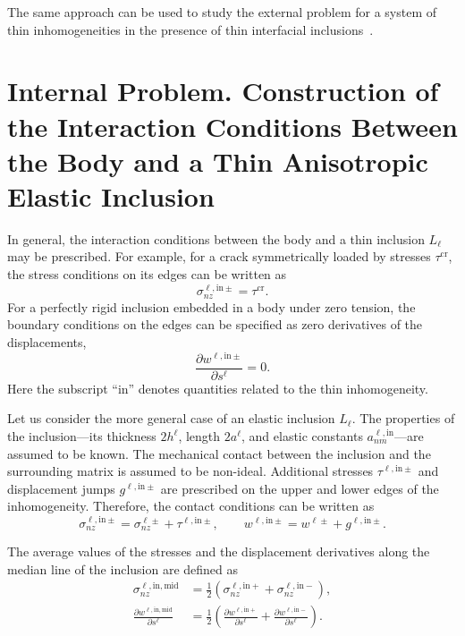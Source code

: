 The same approach can be used to study the external problem for a system of thin inhomogeneities in the presence of thin interfacial inclusions~\cite{Vasilev28}.

\section{Internal Problem. Construction of the Interaction Conditions Between the Body and a Thin Anisotropic Elastic Inclusion}\label{VasilevSec6}

In general, the interaction conditions between the body and a thin inclusion $L_{\ell}$ may be prescribed.
For example, for a crack symmetrically loaded by stresses $\tau^{\mathrm{cr}}$, the stress conditions on its edges can be written as
\[
\sigma_{nz}^{\ell,\mathrm{in}\pm}=\tau^{\mathrm{cr}}.
\]
For a perfectly rigid inclusion embedded in a body under zero tension, the boundary conditions on the edges can be specified as zero derivatives of the displacements,
\[
\frac{\partial w^{\ell,\mathrm{in}\pm}}{\partial s^{\ell}}=0.
\]
Here the subscript “in” denotes quantities related to the thin inhomogeneity.

Let us consider the more general case of an elastic inclusion $L_{\ell}$.
The properties of the inclusion—its thickness $2h^{\ell}$, length $2a^{\ell}$, and elastic constants $a_{nm}^{\ell,\mathrm{in}}$—are assumed to be known.
The mechanical contact between the inclusion and the surrounding matrix is assumed to be non-ideal.
Additional stresses $\tau^{\ell,\mathrm{in}\pm}$ and displacement jumps $g^{\ell,\mathrm{in}\pm}$ are prescribed on the upper and lower edges of the inhomogeneity.
Therefore, the contact conditions can be written as
\begin{equation}
	\label{VasilevEq19}
	\sigma_{nz}^{\ell,\mathrm{in}\pm}
	=
	\sigma_{nz}^{\ell\pm}
	+
	\tau^{\ell,\mathrm{in}\pm},
	\qquad
	w^{\ell,\mathrm{in}\pm}
	=
	w^{\ell\pm}
	+
	g^{\ell,\mathrm{in}\pm}.
\end{equation}

The average values of the stresses and the displacement derivatives along the median line of the inclusion are defined as
\begin{equation}
	\label{VasilevEq20}
	\begin{aligned}
	\sigma_{nz}^{\ell,\mathrm{in,mid}}
	&=
	\frac{1}{2}
	\left(
	\sigma_{nz}^{\ell,\mathrm{in}+}
	+
	\sigma_{nz}^{\ell,\mathrm{in}-}
	\right),
	\\
	\frac{\partial w^{\ell,\mathrm{in,mid}}}{\partial s^{\ell}}
	&=
	\frac{1}{2}
	\left(
	\frac{\partial w^{\ell,\mathrm{in}+}}{\partial s^{\ell}}
	+
	\frac{\partial w^{\ell,\mathrm{in}-}}{\partial s^{\ell}}
	\right).
	\end{aligned}
\end{equation}


